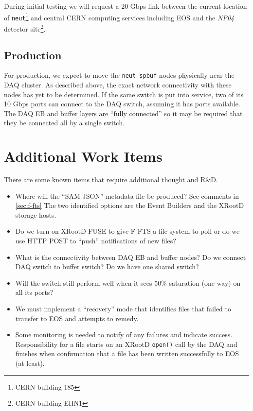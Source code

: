 \documentclass[pdftex,12pt,letter]{article}
\newcommand{\xrd}{XRootD\xspace}
\newcommand{\expname}{\textit{NP04}\xspace}
\begin{document}
During initial testing we will request a 20 Gbps link between the
current location of \texttt{neut}\footnote{CERN building 185} and
central CERN computing services including EOS and the \expname detector
site\footnote{CERN building EHN1}.

\subsection{Production}

For production, we expect to move the \texttt{neut-spbuf} nodes
physically near the DAQ cluster.  As described above, the exact
network connectivity with these nodes has yet to be determined.  If
the same switch is put into service, two of its 10 Gbps ports can
connect to the DAQ switch, assuming it has ports available.  The DAQ
EB and buffer layers are ``fully connected'' so it may be required
that they be connected all by a single switch.  

\section{Additional Work Items}
There are some known items that require additional thought and R\&D.
\begin{itemize}
\item Where will the ``SAM JSON'' metadata file be produced?  See
  comments in \ref{sec:f-fts} The two identified options are the Event
  Builders and the \xrd storage hosts.
\item Do we turn on \xrd-FUSE to give F-FTS a file system to poll or
  do we use HTTP POST to ``push'' notifications of new files?
\item What is the connectivity between DAQ EB and buffer nodes?  Do we
  connect DAQ switch to buffer switch?  Do we have one shared switch?
\item Will the switch still perform well when it sees 50\% saturation
  (one-way) on all its ports?
\item We must implement a ``recovery'' mode that identifies files that
  failed to transfer to EOS and attempts to remedy.
\item Some monitoring is needed to notify of any failures and indicate
  success.  Responsibility for a file starts on an \xrd
  \texttt{open()} call by the DAQ and finishes when confirmation that
  a file has been written successfully to EOS (at least).  
\end{itemize}
\end{document}
